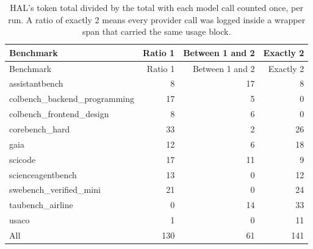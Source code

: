 \begin{longtable}{lrrr}
\caption{HAL's token total divided by the total with each model call counted once, per run. A ratio of exactly 2 means every provider call was logged inside a wrapper span that carried the same usage block.}\label{tab:supp-doublecount}\\
\toprule
Benchmark & Ratio 1 & Between 1 and 2 & Exactly 2 \\
\midrule
\endfirsthead
\toprule
Benchmark & Ratio 1 & Between 1 and 2 & Exactly 2 \\
\midrule
\endhead
\bottomrule
\endfoot
assistantbench & 8 & 17 & 8 \\
colbench\_backend\_programming & 17 & 5 & 0 \\
colbench\_frontend\_design & 8 & 6 & 0 \\
corebench\_hard & 33 & 2 & 26 \\
gaia & 12 & 6 & 18 \\
scicode & 17 & 11 & 9 \\
scienceagentbench & 13 & 0 & 12 \\
swebench\_verified\_mini & 21 & 0 & 24 \\
taubench\_airline & 0 & 14 & 33 \\
usaco & 1 & 0 & 11 \\
\midrule
All & 130 & 61 & 141 \\
\end{longtable}
